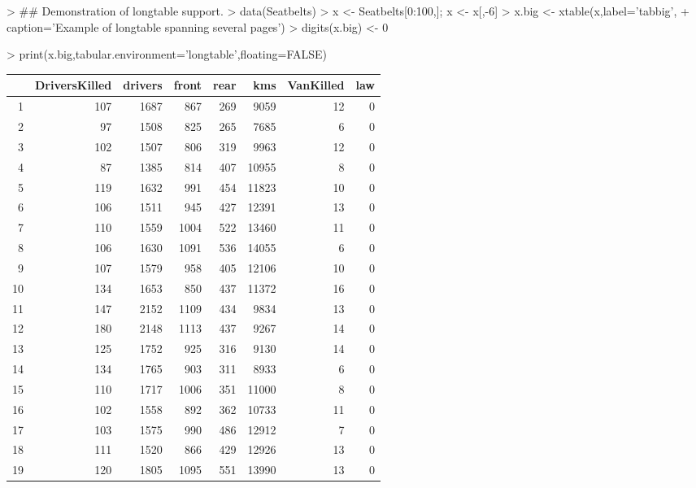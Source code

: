 \documentclass[letterpaper]{article}
\begin{document}
\begin{Schunk}
\begin{Sinput}
> ## Demonstration of longtable support.
> data(Seatbelts)
> x <- Seatbelts[0:100,]; x <- x[,-6]
> x.big <- xtable(x,label='tabbig',
+ 	caption='Example of longtable spanning several pages')
> digits(x.big) <- 0
\end{Sinput}
\end{Schunk}
\begin{Schunk}
\begin{Sinput}
> print(x.big,tabular.environment='longtable',floating=FALSE)
\end{Sinput}
% latex table generated in R 3.1.1 by xtable 1.7-3 package
% 
\begin{longtable}{rrrrrrrr}
  \hline
 & DriversKilled & drivers & front & rear & kms & VanKilled & law \\ 
  \hline
1 & 107 & 1687 & 867 & 269 & 9059 & 12 & 0 \\ 
  2 & 97 & 1508 & 825 & 265 & 7685 & 6 & 0 \\ 
  3 & 102 & 1507 & 806 & 319 & 9963 & 12 & 0 \\ 
  4 & 87 & 1385 & 814 & 407 & 10955 & 8 & 0 \\ 
  5 & 119 & 1632 & 991 & 454 & 11823 & 10 & 0 \\ 
  6 & 106 & 1511 & 945 & 427 & 12391 & 13 & 0 \\ 
  7 & 110 & 1559 & 1004 & 522 & 13460 & 11 & 0 \\ 
  8 & 106 & 1630 & 1091 & 536 & 14055 & 6 & 0 \\ 
  9 & 107 & 1579 & 958 & 405 & 12106 & 10 & 0 \\ 
  10 & 134 & 1653 & 850 & 437 & 11372 & 16 & 0 \\ 
  11 & 147 & 2152 & 1109 & 434 & 9834 & 13 & 0 \\ 
  12 & 180 & 2148 & 1113 & 437 & 9267 & 14 & 0 \\ 
  13 & 125 & 1752 & 925 & 316 & 9130 & 14 & 0 \\ 
  14 & 134 & 1765 & 903 & 311 & 8933 & 6 & 0 \\ 
  15 & 110 & 1717 & 1006 & 351 & 11000 & 8 & 0 \\ 
  16 & 102 & 1558 & 892 & 362 & 10733 & 11 & 0 \\ 
  17 & 103 & 1575 & 990 & 486 & 12912 & 7 & 0 \\ 
  18 & 111 & 1520 & 866 & 429 & 12926 & 13 & 0 \\ 
  19 & 120 & 1805 & 1095 & 551 & 13990 & 13 & 0 \\ 

\end{longtable}
\end{Schunk}
\end{document}
